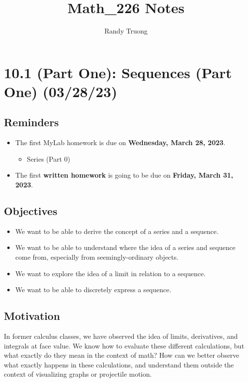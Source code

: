 \documentclass{report}
\title{Math\_226 Notes}
\author{Randy Truong}
\begin{document}
\maketitle
\begin{sloppypar}
  \tableofcontents

\chapter{10.1 (Part One): Sequences (Part One) (03/28/23)}
\section{Reminders}
\begin{itemize}
  \item The first MyLab homework is due on
        \textbf{Wednesday, March 28, 2023}.
        \begin{itemize}
                \item Series (Part 0)
        \end{itemize}
  \item The first \textbf{written homework} is going to
        be due on \textbf{Friday, March 31, 2023}.

\end{itemize}

\section{Objectives}
\begin{itemize}
  \item We want to be able to derive the concept of a
        series and a sequence.
  \item We want to be able to understand
        where the idea of a series and sequence come from,
        especially from seemingly-ordinary objects.
  \item We want to explore the idea of a limit
        in relation to a sequence.
  \item We want to be able to discretely express
        a sequence.

\end{itemize}

\section{Motivation}
In former calculus classes, we have observed the idea of limits, derivatives, and integrals at face value. We
know how to evaluate these different calculations, but
what exactly do they mean in the context of math? How can
we better observe what exactly happens in these calculations,
and understand them outside the context of visualizing graphs
or projectile motion.

\end{sloppypar}
\end{document}
